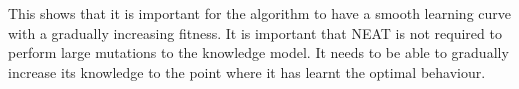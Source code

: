 This shows that it is important for the algorithm to have a smooth learning curve with a gradually increasing fitness. It is important that NEAT is not required to perform large mutations to the knowledge model. It needs to be able to gradually increase its knowledge to the point where it has learnt the optimal behaviour.



